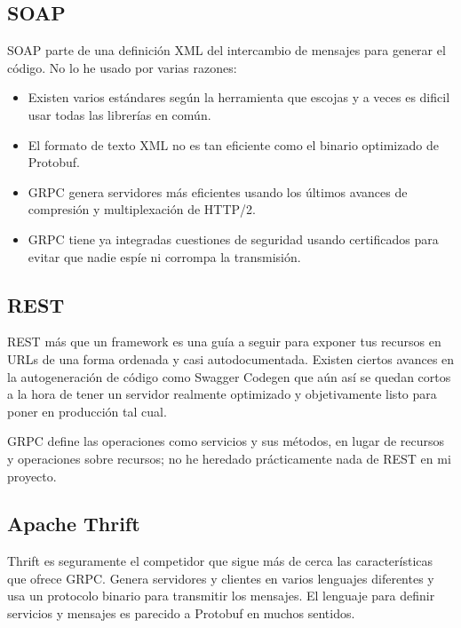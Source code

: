 \subsection{SOAP}
\label{subsec:alt-soap}

SOAP parte de una definición XML del intercambio de mensajes para generar el código. No lo he usado por varias razones:
\begin{itemize}
    \item Existen varios estándares según la herramienta que escojas y a veces es dificil usar todas las librerías en común.
    \item El formato de texto XML no es tan eficiente como el binario optimizado de Protobuf.
    \item GRPC genera servidores más eficientes usando los últimos avances de compresión y multiplexación de HTTP/2.
    \item GRPC tiene ya integradas cuestiones de seguridad usando certificados para evitar que nadie espíe ni corrompa la transmisión.
\end{itemize}

\subsection{REST}
\label{subsec:alt-rest}

REST más que un framework es una guía a seguir para exponer tus recursos en URLs de una forma ordenada y casi autodocumentada. Existen ciertos avances en la autogeneración de código como Swagger Codegen\cite{swaggercodegen} que aún así se quedan cortos a la hora de tener un servidor realmente optimizado y objetivamente listo para poner en producción tal cual.

GRPC define las operaciones como servicios y sus métodos, en lugar de recursos y operaciones sobre recursos; no he heredado prácticamente nada de REST en mi proyecto.

\subsection{Apache Thrift}
\label{subsec:thrift}

Thrift\cite{thrift} es seguramente el competidor que sigue más de cerca las características que ofrece GRPC. Genera servidores y clientes en varios lenguajes diferentes y usa un protocolo binario para transmitir los mensajes. El lenguaje para definir servicios y mensajes es parecido a Protobuf en muchos sentidos.

